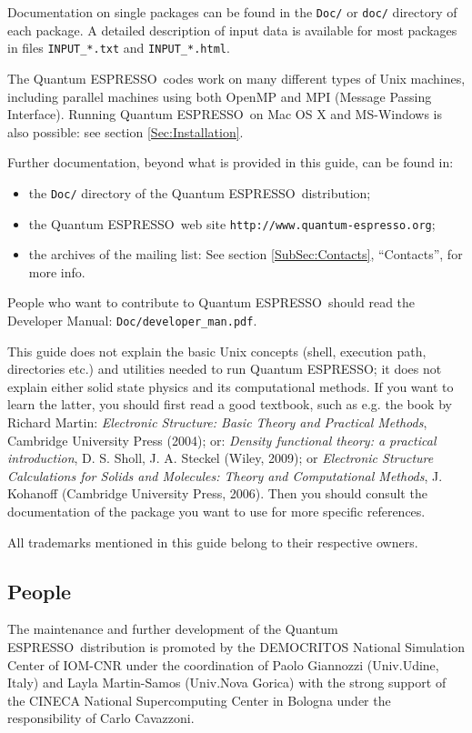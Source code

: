 \documentclass[12pt,a4paper]{article}
\def\qe{{\sc Quantum ESPRESSO}}
\begin{document}
Documentation on single packages can be found in the \texttt{Doc/} or
\texttt{doc/} directory of each package. A detailed description of input
data is available for most packages in files \texttt{INPUT\_*.txt} and 
\texttt{INPUT\_*.html}.

The \qe\ codes work on many different types of Unix machines,
including parallel machines using both OpenMP and MPI 
(Message Passing Interface).
Running \qe\ on Mac OS X and MS-Windows is also possible: 
see section \ref{Sec:Installation}.

Further documentation, beyond what is provided in this guide, can be found in:
\begin{itemize}
  \item the \texttt{Doc/} directory of the \qe\ distribution;
  \item the \qe\ web site \texttt{http://www.quantum-espresso.org};
  \item the archives of the  mailing list:
   See section \ref{SubSec:Contacts}, ``Contacts'', for more info.
\end{itemize}
People who want to contribute to \qe\ should read the 
Developer Manual: \texttt{Doc/developer\_man.pdf}.

This guide does not explain the basic Unix concepts (shell, execution 
path, directories etc.) and utilities needed to run \qe; it does not 
explain either solid state physics and its computational methods.
If you want to learn the latter, you should first read a good textbook, 
such as e.g. the book by Richard Martin:
{\em Electronic Structure: Basic Theory and Practical Methods},
Cambridge University Press (2004); or:
{\em Density functional theory: a practical introduction}, 
D. S. Sholl, J. A. Steckel (Wiley, 2009); or
{\em Electronic Structure Calculations for Solids and Molecules:
Theory and Computational Methods}, 
J. Kohanoff (Cambridge University Press, 2006). Then you should consult
the documentation of the package you want to use for more specific references.

All trademarks mentioned in this guide belong to their respective owners.

\subsection{People}

The maintenance and further development of the \qe\ distribution
is promoted by the DEMOCRITOS National Simulation Center 
of IOM-CNR under the coordination of
Paolo Giannozzi (Univ.Udine, Italy) and Layla Martin-Samos 
(Univ.Nova Gorica) with the strong support
of the CINECA National Supercomputing Center in Bologna under 
the responsibility of Carlo Cavazzoni.
\end{document}
